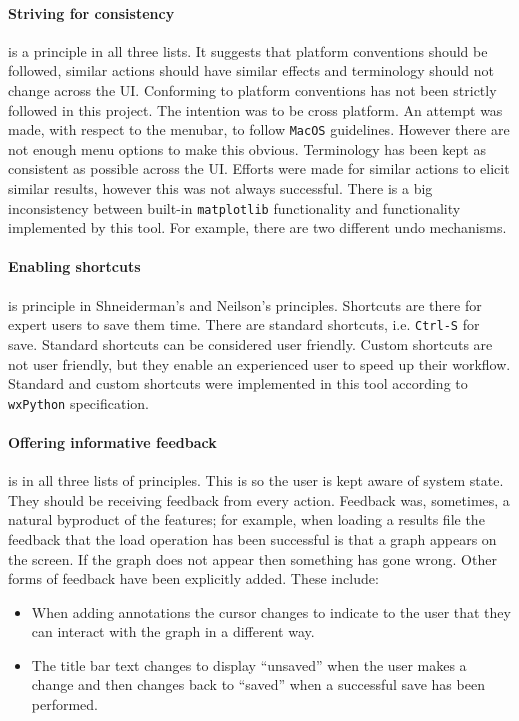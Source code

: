 \paragraph*{Striving for consistency} is a principle in all three lists.  It suggests that platform conventions should be followed, similar actions should have similar effects and terminology should not change across the \ac{UI}.  Conforming to platform conventions has not been strictly followed in this project.  The intention was to be cross platform.  An attempt was made, with respect to the menubar, to follow \texttt{MacOS} guidelines.  However there are not enough menu options to make this obvious.  Terminology has been kept as consistent as possible across the \ac{UI}.  Efforts were made for similar actions to elicit similar results, however this was not always successful.  There is a big inconsistency between built-in \texttt{matplotlib} functionality and functionality implemented by this tool.  For example, there are two different undo mechanisms.

\paragraph*{Enabling shortcuts} is principle in Shneiderman's and Neilson's principles.  Shortcuts are there for expert users to save them time.  There are standard shortcuts, i.e. \texttt{Ctrl-S} for save.  Standard shortcuts can be considered user friendly.  Custom shortcuts are not user friendly, but they enable an experienced user to speed up their workflow.  Standard and custom shortcuts were implemented in this tool according to \texttt{wxPython} specification.

\paragraph*{Offering informative feedback} is in all three lists of principles.  This is so the user is kept aware of system state.  They should be receiving feedback from every action. Feedback was, sometimes, a natural byproduct of the features; for example, when loading a results file the feedback that the load operation has been successful is that a graph appears on the screen. If the graph does not appear then something has gone wrong.  Other forms of feedback have been explicitly added.  These include:
\begin{itemize}
\item When adding annotations the cursor changes to indicate to the user that they can interact with the graph in a different way.
\item The title bar text changes to display ``unsaved'' when the user makes a change and then changes back to ``saved'' when a successful save has been performed.
\end{itemize}

